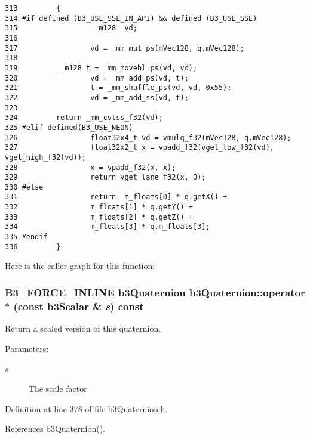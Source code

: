 \begin{Code}\begin{verbatim}313         {
314 #if defined (B3_USE_SSE_IN_API) && defined (B3_USE_SSE)
315                 __m128  vd;
316                 
317                 vd = _mm_mul_ps(mVec128, q.mVec128);
318                 
319         __m128 t = _mm_movehl_ps(vd, vd);
320                 vd = _mm_add_ps(vd, t);
321                 t = _mm_shuffle_ps(vd, vd, 0x55);
322                 vd = _mm_add_ss(vd, t);
323                 
324         return _mm_cvtss_f32(vd);
325 #elif defined(B3_USE_NEON)
326                 float32x4_t vd = vmulq_f32(mVec128, q.mVec128);
327                 float32x2_t x = vpadd_f32(vget_low_f32(vd), vget_high_f32(vd));  
328                 x = vpadd_f32(x, x);
329                 return vget_lane_f32(x, 0);
330 #else    
331                 return  m_floats[0] * q.getX() + 
332                 m_floats[1] * q.getY() + 
333                 m_floats[2] * q.getZ() + 
334                 m_floats[3] * q.m_floats[3];
335 #endif
336         }
\end{verbatim}
\end{Code}




Here is the caller graph for this function:\hypertarget{classb3_quaternion_ad2b1b2ec07bc16942c47eb5c7750016}{
\subsubsection[operator$\ast$]{\setlength{\rightskip}{0pt plus 5cm}B3\_\-FORCE\_\-INLINE {\bf b3Quaternion} b3Quaternion::operator$\ast$ (const b3Scalar \& {\em s}) const}}
\label{classb3_quaternion_ad2b1b2ec07bc16942c47eb5c7750016}


Return a scaled version of this quaternion. 

\begin{Desc}
\item[Parameters:]
\begin{description}
\item[{\em s}]The scale factor \end{description}
\end{Desc}


Definition at line 378 of file b3Quaternion.h.

References b3Quaternion().

